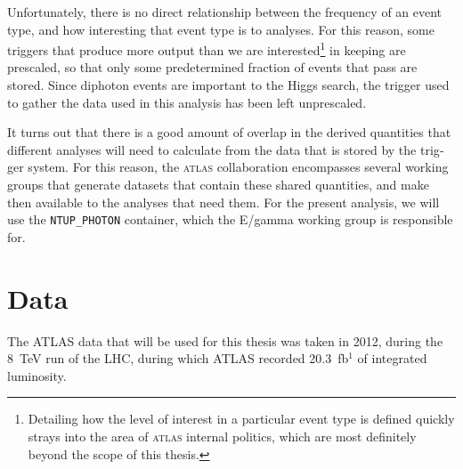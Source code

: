 \begin{english}
Unfortunately, there is no direct relationship between the frequency of an event type, and how interesting that event type is to analyses. For this reason, some triggers that produce more output than we are interested\footnote{Detailing how the level of interest in a particular event type is defined quickly strays into the area of \textsc{atlas} internal politics, which are most definitely beyond the scope of this thesis.} in keeping are prescaled, so that only some predetermined fraction of events that pass are stored. Since diphoton events are important to the Higgs search, the trigger used to gather the data used in this analysis has been left unprescaled.

It turns out that there is a good amount of overlap in the derived quantities that different analyses will need to calculate from the data that is stored by the trigger system. For this reason, the \textsc{atlas} collaboration encompasses several working groups that generate datasets that contain these shared quantities, and make then available to the analyses that need them. For the present analysis, we will use the \texttt{NTUP\_PHOTON} container, which the E/gamma working group is responsible for.


\chapter{Data}
The ATLAS data that will be used for this thesis was taken in 2012, during the 8~TeV run of the LHC, during which ATLAS recorded 20.3~fb$^{1}$ of integrated luminosity.


\end{english}

